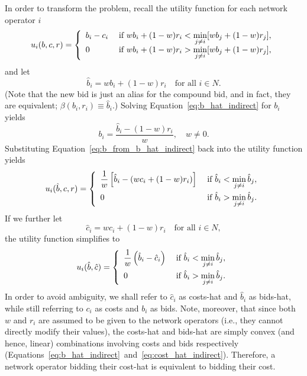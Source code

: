 In order to transform the problem, recall the utility function for each network operator $i$
\begin{equation*}
  u_i(b,c,r) = \left\{
  \begin{array}{l l}
    b_i-c_i & \;\text{if } wb_i + (1-w)r_i < \displaystyle\min_{j\neq i}[wb_j + (1-w)r_j],\\
    0 & \;\text{if } wb_i + (1-w)r_i > \displaystyle\min_{j\neq i}[wb_j + (1-w)r_j],
  \end{array}\right.
\end{equation*}
and let
\begin{equation}
  \label{eq:b_hat_indirect}
  \hat{b}_i = wb_i + (1-w)r_i \quad\text{for all } i\in N.
\end{equation}
(Note that the new bid is just an alias for the compound bid, and in fact, they are equivalent; $\beta(b_i,r_i)\equiv\hat{b}_i$.) Solving Equation~\eqref{eq:b_hat_indirect} for $b_i$ yields
\begin{equation}
  \label{eq:b_from_b_hat_indirect}
  b_i = \frac{\hat{b}_i - (1-w)r_i}{w}, \quad w\neq 0.
\end{equation}
Substituting Equation~\eqref{eq:b_from_b_hat_indirect} back into the utility function yields
\begin{equation*}
  u_i(\hat{b},c,r) = \left\{
  \begin{array}{l l}
    \displaystyle\frac{1}{w}\left[\hat{b}_i-(wc_i + (1-w)r_i)\right] & \;\text{if } \hat{b}_i < \displaystyle\min_{j\neq i}\hat{b}_j,\\[2ex]
    0 & \;\text{if } \hat{b}_i > \displaystyle\min_{j\neq i}\hat{b}_j.
  \end{array}\right.
\end{equation*}
If we further let
\begin{equation}
  \label{eq:cost_hat_indirect}
  \hat{c}_i = wc_i + (1-w)r_i \quad\text{for all } i\in N,
\end{equation}
the utility function simplifies to
\begin{equation}
  \label{eq:sellers_utility_hat_indirect}
  u_i(\hat{b},\hat{c}) = \left\{
  \begin{array}{l l}
    \displaystyle\frac{1}{w}\left(\hat{b}_i-\hat{c}_i\right) & \;\text{if } \hat{b}_i < \displaystyle\min_{j\neq i}\hat{b}_j,\\[2ex]
    0 & \;\text{if } \hat{b}_i > \displaystyle\min_{j\neq i}\hat{b}_j.
  \end{array}\right.
\end{equation}
In order to avoid ambiguity, we shall refer to $\hat{c}_i$ as costs-hat and $\hat{b}_i$ as bids-hat, while still referring to $c_i$ as costs and $b_i$ as bids. Note, moreover, that since both $w$ and $r_i$ are assumed to be given to the network operators (i.e., they cannot directly modify their values), the costs-hat and bids-hat are simply convex (and hence, linear) combinations involving costs and bids respectively (Equations~\eqref{eq:b_hat_indirect}~and~\eqref{eq:cost_hat_indirect}). Therefore, a network operator bidding their cost-hat is equivalent to bidding their cost.

